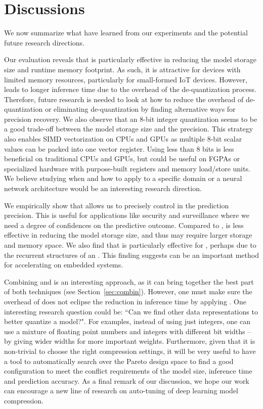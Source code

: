 \section{Discussions}
We now summarize what have learned from our experiments and the potential future research directions.

Our evaluation reveals that \dquantization is particularly effective in reducing the model storage size and runtime memory footprint. As
such, it is attractive for devices with limited memory resources, particularly for small-formed IoT devices. However, \quantization leads
to longer inference time due to the overhead of the de-quantization process. Therefore, future research is needed to look at how to reduce
the overhead of de-quantization or eliminating de-quantization by finding alternative ways for precision recovery. We also observe that an
8-bit integer quantization seems to be a good trade-off between the model storage size and the precision. This strategy also enables SIMD
vectorization on CPUs and GPUs as multiple 8-bit scalar values can be packed into one vector register. Using less than 8 bits is less
beneficial on traditional CPUs and GPUs, but could be useful on FGPAs or specialized hardware with purpose-built registers and memory
load/store units. We believe studying when and how to apply \dquantization to a specific domain or a neural network architecture would be
an interesting research direction.

We empirically show that \pruning allows us to precisely control in the prediction precision. This is useful for applications like security
and surveillance where we need a degree of confidences on the predictive outcome. Compared to \dquantization, \pruning is less effective in
reducing the model storage size, and thus may require larger storage and memory space. We also find that \pruning is particularly effective
for \RNNs, perhaps due to the recurrent structures of an \RNN. This finding suggests \pruning can be an important method for accelerating
\RNN on embedded systems.

Combining \dquantization and \pruning is an interesting approach, as it can bring together the best part of both techniques (see
Section~\ref{sec:combin}). However, one must  make sure the overhead of \dquantization does not eclipse the reduction in inference time by
applying \pruning. One interesting research question could be: ``Can we find other data representations to better quantize a model?". For
examples, instead of using just integers, one can use a mixture of floating point numbers and integers with different bit widths – by
giving wider widths for more important weights. Furthermore, given that it is non-trivial to choose the right compression settings, it will
be very useful to have a tool to automatically search over the Pareto design space to find a good configuration to meet the conflict
requirements of the model size, inference time and prediction accuracy.  As a final remark of our discussion, we hope our work can
encourage a new line of research on auto-tuning of deep learning model compression.
